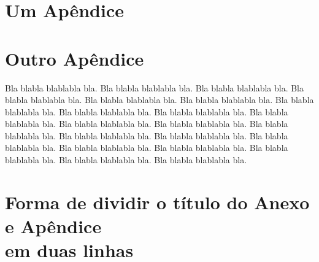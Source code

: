 \documentclass[diss,capa,times,english]{ppgci}
\begin{document}
\printbibliography      %

\apendices
\chapter{Um Apêndice} \label{apen_A} 



\chapter{Outro Apêndice} \label{apen_B}

Bla blabla blablabla bla.  Bla blabla blablabla bla.  Bla blabla
blablabla bla.  Bla blabla blablabla bla.  Bla blabla blablabla bla.
Bla blabla blablabla bla.  Bla blabla blablabla bla.  Bla blabla
blablabla bla.  Bla blabla blablabla bla.  Bla blabla blablabla bla.
Bla blabla blablabla bla.  Bla blabla blablabla bla.  Bla blabla
blablabla bla.  Bla blabla blablabla bla.  Bla blabla blablabla bla.
Bla blabla blablabla bla.  Bla blabla blablabla bla.  Bla blabla
blablabla bla.  Bla blabla blablabla bla.  Bla blabla blablabla bla.
Bla blabla blablabla bla.

\anexos
\chapter{Forma de dividir o título do Anexo e Apêndice \texorpdfstring{\\}{} em duas linhas} \label{anex_A}


\end{document}
